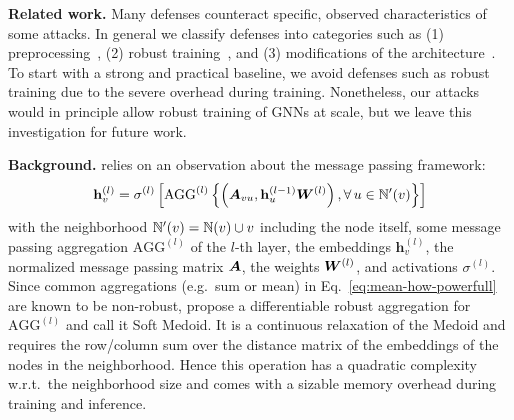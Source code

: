 \documentclass[sigconf, review]{acmart}
\newcommand{\adj}{\mA}
\newcommand{\weight}{\mW}
\newcommand{\neighbors}{\sN}
\begin{document}
\textbf{Related work.} Many defenses counteract specific, observed characteristics of some attacks. In general we classify defenses into categories such as (1) preprocessing~\citep{Entezari2020,Wu2019}, (2) robust training~\citep{Xu2019a, Zugner2019a}, and (3) modifications of the architecture~\citep{Zhu2019, Zhang2019a,Geisler2020}. To start with a strong and practical baseline, we avoid defenses such as robust training due to the severe overhead during training. Nonetheless, our attacks would in principle allow robust training of GNNs at scale, but we leave this investigation for future work.

\textbf{Background.} \citet{Geisler2020} relies on an observation about the message passing framework:
\begin{equation}\label{eq:mean-how-powerfull}
  \mathbf{h}^{(l)}_v = \sigma^{(l)} \left[ \text{AGG}^{(l)} \left \{ \left( \adj_{vu}, \mathbf{h}^{(l-1)}_u \weight^{(l)} \right), \forall \, u\in \neighbors'(v) \right \} \right]
\end{equation}
with the neighborhood \(\neighbors'(v) = \neighbors(v) \cup v\) including the node itself, some message passing aggregation \(\text{AGG}^{(l)}\) of the \(l\)-th layer, the embeddings \(\mathbf{h}^{(l)}_v\), the normalized message passing matrix \(\adj\), the weights \(\weight^{(l)}\), and activations \( \sigma^{(l)}\). Since common aggregations (e.g.\ sum or mean) in Eq.~\ref{eq:mean-how-powerfull} are known to be non-robust, \citet{Geisler2020} propose a differentiable robust aggregation for \(\text{AGG}^{(l)}\) and call it Soft Medoid. It is a continuous relaxation of the Medoid and requires the row/column sum over the distance matrix of the embeddings of the nodes in the neighborhood. Hence this operation has a quadratic complexity w.r.t.\ the neighborhood size and comes with a sizable memory overhead during training and inference.
\end{document}
